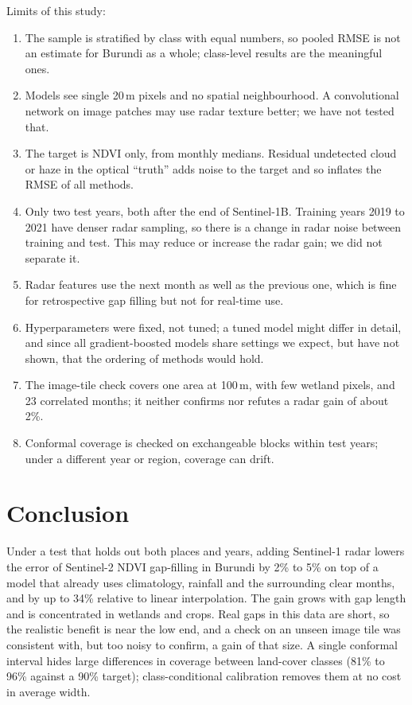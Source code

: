 \documentclass[conference]{IEEEtran}
\begin{document}
Limits of this study:
\begin{enumerate}
\item The sample is stratified by class with equal numbers, so pooled RMSE is not an estimate for Burundi as a whole; class-level results are the meaningful ones.
\item Models see single 20\,m pixels and no spatial neighbourhood. A convolutional network on image patches may use radar texture better; we have not tested that.
\item The target is NDVI only, from monthly medians. Residual undetected cloud or haze in the optical ``truth'' adds noise to the target and so inflates the RMSE of all methods.
\item Only two test years, both after the end of Sentinel-1B. Training years 2019 to 2021 have denser radar sampling, so there is a change in radar noise between training and test. This may reduce or increase the radar gain; we did not separate it.
\item Radar features use the next month as well as the previous one, which is fine for retrospective gap filling but not for real-time use.
\item Hyperparameters were fixed, not tuned; a tuned model might differ in detail, and since all gradient-boosted models share settings we expect, but have not shown, that the ordering of methods would hold.
\item The image-tile check covers one area at 100\,m, with few wetland pixels, and 23 correlated months; it neither confirms nor refutes a radar gain of about 2\%.
\item Conformal coverage is checked on exchangeable blocks within test years; under a different year or region, coverage can drift.
\end{enumerate}

\section{Conclusion}

Under a test that holds out both places and years, adding Sentinel-1 radar lowers the error of Sentinel-2 NDVI gap-filling in Burundi by 2\% to 5\% on top of a model that already uses climatology, rainfall and the surrounding clear months, and by up to 34\% relative to linear interpolation. The gain grows with gap length and is concentrated in wetlands and crops. Real gaps in this data are short, so the realistic benefit is near the low end, and a check on an unseen image tile was consistent with, but too noisy to confirm, a gain of that size. A single conformal interval hides large differences in coverage between land-cover classes (81\% to 96\% against a 90\% target); class-conditional calibration removes them at no cost in average width.



\end{document}
